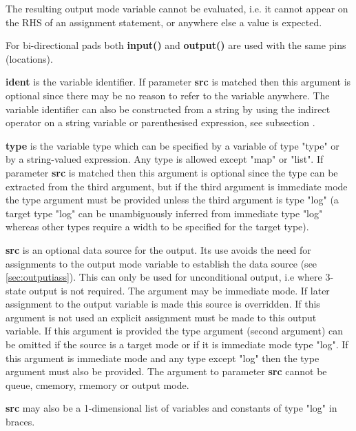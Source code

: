         The resulting output mode variable cannot be evaluated, i.e. it cannot
        appear on the RHS of an assignment statement, or anywhere else a value
        is expected.
        
        For bi-directional pads both {\bf input()} and {\bf output()} are
        used with the same pins (locations).
        
        {\bf ident} is the variable identifier. If parameter {\bf src} is matched
        then this argument is optional since there may be no reason to refer to the
        variable anywhere. The variable identifier can also be constructed from a
        string by using the indirect operator on a string variable or parenthesised
        expression, see subsection .

        {\bf type} is the variable type which can be specified by a variable of
        type "type" or by a string-valued expression. Any type is allowed except
        "map" or "list". If parameter {\bf src} is matched then this argument is
        optional since the type can be extracted from the third argument, but if
        the third argument is immediate mode the type argument must be provided
        unless the third argument is type "log" (a target type "log" can be
        unambiguously inferred from immediate type "log" whereas other types
        require a width to be specified for the target type).
        
        {\bf src} is an optional data source for the output. Its use avoids the
        need for assignments to the output mode variable to establish the data
        source (see \ref{sec:outputiass}). This can only be used for
        unconditional output, i.e where 3-state output is not required. The
        argument may be immediate mode. If later assignment to the output
        variable is made this source is overridden. If this argument is not used
        an explicit assignment must be made to this output variable. If this
        argument is provided the type argument (second argument) can be omitted
        if the source is a target mode or if it is immediate mode type "log". If
        this argument is immediate mode and any type except "log" then the type
        argument must also be provided. The argument to parameter {\bf src}
        cannot be queue, cmemory, rmemory or output mode.
        
        {\bf src} may also be a 1-dimensional list of variables and constants
        of type "log" in braces.
        
